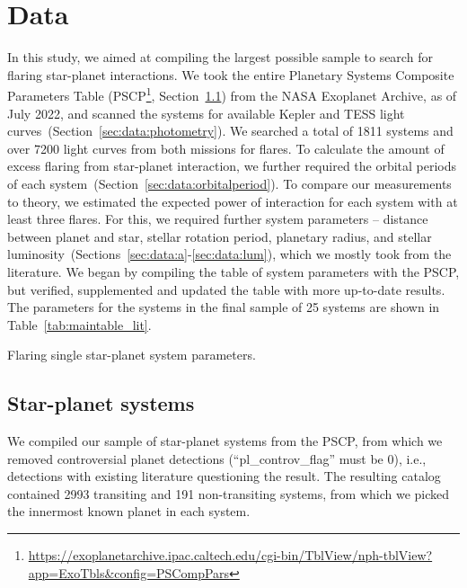 \documentclass[twocolumn]{aastex631}
\begin{document}
\section{Data}
\label{sec:data}
In this study, we aimed at compiling the largest possible sample to search for flaring star-planet interactions. We took the entire Planetary Systems Composite Parameters Table (PSCP\footnote{ \url{https://exoplanetarchive.ipac.caltech.edu/cgi-bin/TblView/nph-tblView?app=ExoTbls&config=PSCompPars}}, Section~\ref{sec:data:sps}) from the NASA Exoplanet Archive, as of July 2022, and scanned the systems for available Kepler and TESS light curves~(Section~\ref{sec:data:photometry}). We searched a total of 1811 systems and over 7200 light curves from both missions for flares. To calculate the amount of excess flaring from star-planet interaction, we further required the orbital periods of each system~(Section~\ref{sec:data:orbitalperiod}). To compare our measurements to theory, we estimated the expected power of interaction for each system with at least three flares. For this, we required further system parameters -- distance between planet and star, stellar rotation period, planetary radius, and stellar luminosity~(Sections~\ref{sec:data:a}-\ref{sec:data:lum}), which we mostly took from the literature. We began by compiling the table of system parameters with the PSCP, but verified, supplemented and updated the table with more up-to-date results. The parameters for the systems in the final sample of 25 systems are shown in Table~\ref{tab:maintable_lit}.


\begin{table*}
\movetableright=-20mm
\footnotesize
    \caption{Flaring single star-planet system parameters.}
    
        \label{tab:maintable_lit}
    \tablerefs{}
\end{table*}


\subsection{Star-planet systems}
\label{sec:data:sps}
We compiled our sample of star-planet systems from the PSCP, from which we removed controversial planet detections (``pl\_controv\_flag'' must be 0), i.e., detections with existing literature questioning the result. The resulting catalog contained 2993 transiting and 191 non-transiting systems, from which we picked the innermost known planet in each system. 
\end{document}

